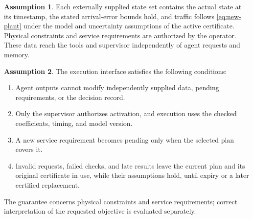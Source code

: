 \documentclass[preprint,12pt]{elsarticle}
\theoremstyle{definition}
\newtheorem{assumption}{Assumption}
\theoremstyle{plain}
\theoremstyle{definition}
\theoremstyle{plain}
\begin{document}
\begin{assumption}
\label{ass:trusted-inputs}
Each externally supplied state set contains the actual state at its
timestamp, the stated arrival-error bounds hold, and traffic follows
\eqref{eq:new-plant} under the model and uncertainty assumptions of the
active certificate. Physical constraints and service requirements are
authorized by the operator. These data reach the tools and supervisor
independently of agent requests and memory.
\end{assumption}

\begin{assumption}
\label{ass:supervisory-separation}
The execution interface satisfies the following conditions:
\begin{enumerate}
\renewcommand{\labelenumi}{(\alph{enumi})}
\item Agent outputs cannot modify independently supplied data, pending
requirements, or the decision record.
\item Only the supervisor authorizes activation, and execution uses the
checked coefficients, timing, and model version.
\item A new service requirement becomes pending only when the selected
plan covers it.
\item Invalid requests, failed checks, and late results leave the current
plan and its original certificate in use, while their assumptions hold,
until expiry or a later certified replacement.
\end{enumerate}
\end{assumption}

The guarantee concerns physical constraints and service requirements;
correct interpretation of the requested objective is evaluated separately.
\end{document}
